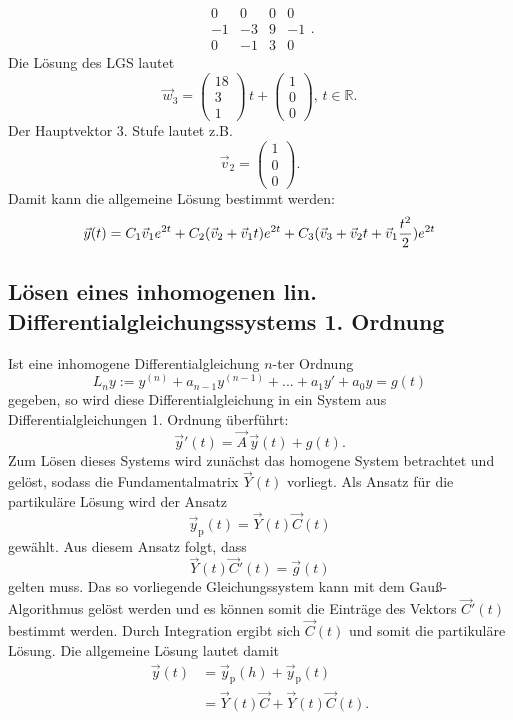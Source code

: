 $$
\begin{array}{rrr|l}
0 & 0 & 0 & 0 \\
-1 & -3 & 9 & -1 \\
0 & -1 & 3 & 0 
\end{array}.
$$
Die L\"osung des LGS lautet
$$
\vec w_3 = \begin{pmatrix} 18 \\ 3 \\ 1 \end{pmatrix} \, t + \begin{pmatrix} 1 \\ 0 \\ 0 \end{pmatrix} ,\, t \in \mathbb{R}.
$$
Der Hauptvektor 3. Stufe lautet z.B.
$$
\vec v_2 = \begin{pmatrix} 1 \\ 0 \\ 0 \end{pmatrix}.
$$
Damit kann die allgemeine L\"osung bestimmt werden:
$$
\vec y(t) = C_1 \vec v_1 e^{2t} + C_2 (\vec v_2 + \vec v_1 t )e^{2t} + C_3 (\vec v_3 + \vec v_2 t + \vec v_1 \frac{t^2}{2}) e^{2t}\\
$$




\subsection*{L\"osen eines inhomogenen lin. Differentialgleichungssystems 1. Ordnung}
Ist eine inhomogene Differentialgleichung $n$-ter Ordnung
\[ 
L_n y := y^{(n)} + a_{n-1} y^{(n-1)} + ... + a_1 y'+ a_0 y = g(t)
\]
gegeben, so wird diese Differentialgleichung in ein System aus Differentialgleichungen 1. Ordnung \"uberf\"uhrt:
$$
\vec y'(t) = \vec A \, \vec y(t) + g(t).
$$
Zum L\"osen dieses Systems wird zun\"achst das homogene System betrachtet und gel\"ost, sodass die Fundamentalmatrix $\vec Y(t)$ vorliegt. Als Ansatz f\"ur die partikul\"are L\"osung wird der Ansatz
$$
\vec y_{\text{p}}(t) = \vec Y(t) \vec C(t)
$$
gew\"ahlt. Aus diesem Ansatz folgt, dass
$$
\vec Y(t) \vec C'(t) = \vec g(t)
$$
gelten muss. Das so vorliegende Gleichungssystem kann mit dem Gau\ss -Algorithmus gel\"ost werden und es k\"onnen somit die Eintr\"age des Vektors $\vec C'(t)$ bestimmt werden. Durch Integration ergibt sich $\vec C(t)$ und somit die partikul\"are L\"osung. Die allgemeine L\"osung lautet damit
\begin{align*}
\vec y(t) &= \vec y_{\text{p}}(h) + \vec y_{\text{p}}(t)\\
          &= \vec Y(t) \vec C + \vec Y(t) \vec C(t).
\end{align*}

